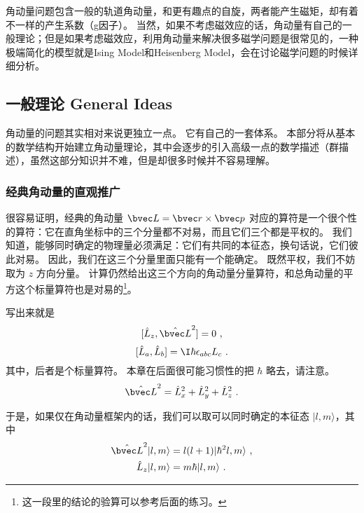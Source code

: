 
角动量问题包含一般的轨道角动量，和更有趣点的自旋，两者能产生磁矩，却有着不一样的产生系数（g因子）。 当然，如果不考虑磁效应的话，角动量有自己的一般理论；但是如果考虑磁效应，利用角动量来解决很多磁学问题是很常见的，一种极端简化的模型就是Ising Model和Heisenberg Model，会在讨论磁学问题的时候详细分析。

\subsection{一般理论 General Ideas}

角动量的问题其实相对来说更独立一点。 它有自己的一套体系。 本部分将从基本的数学结构开始建立角动量理论，其中会逐步的引入高级一点的数学描述（群描述），虽然这部分知识并不难，但是却很多时候并不容易理解。

\subsubsection{经典角动量的直观推广}

很容易证明，经典的角动量 $\bvec L = \bvec r\times \bvec p$ 对应的算符是一个很个性的算符：它在直角坐标中的三个分量都不对易，而且它们三个都是平权的。 我们知道，能够同时确定的物理量必须满足：它们有共同的本征态，换句话说，它们彼此对易。 因此，我们在这三个分量里面只能有一个能确定。 既然平权，我们不妨取为 $z$ 方向分量。 计算仍然给出这三个方向的角动量分量算符，和总角动量的平方这个标量算符也是对易的\footnote{这一段里的结论的验算可以参考后面的练习。}。

写出来就是
\begin{equation}\label{eq_QMAM_1}
[\hat L_z, \hat{\bvec L}^2] = 0~,
\end{equation}
\begin{equation}\label{eq_QMAM_2}
[\hat L_a, \hat L_b] = \I\hbar\epsilon_{abc}L_c~.
\end{equation}
其中，后者是个标量算符。 本章在后面很可能习惯性的把 $\hbar$ 略去，请注意。
\begin{equation}
\hat{\bvec L}^2 = \hat L_x^2+\hat L_y^2+\hat L_z^2~.
\end{equation}

于是，如果仅在角动量框架内的话，我们可以取可以同时确定的本征态 $|l,m\rangle$，其中
\begin{equation}
\begin{aligned}
\hat{\bvec L}^2|l,m\rangle &= l(l+1)|\hbar^2l,m\rangle~,\\
\hat L_z|l,m\rangle &= m\hbar|l,m\rangle~.
\end{aligned}
\end{equation}

